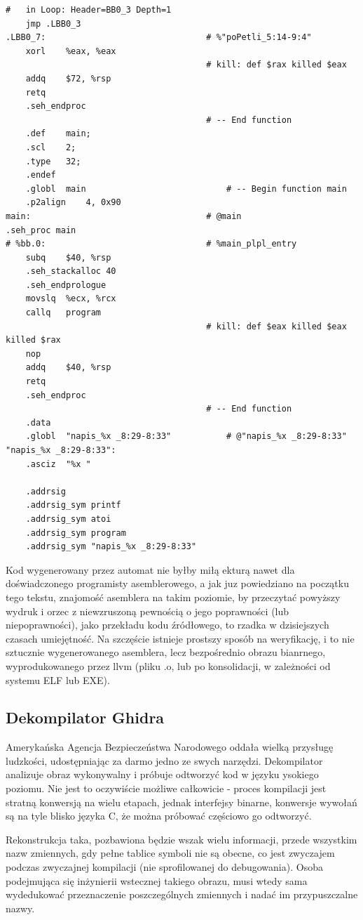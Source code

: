 \begin{lstlisting}[basicstyle=\scriptsize]
                                        #   in Loop: Header=BB0_3 Depth=1
	jmp	.LBB0_3
.LBB0_7:                                # %"poPetli_5:14-9:4"
	xorl	%eax, %eax
                                        # kill: def $rax killed $eax
	addq	$72, %rsp
	retq
	.seh_endproc
                                        # -- End function
	.def	main;
	.scl	2;
	.type	32;
	.endef
	.globl	main                            # -- Begin function main
	.p2align	4, 0x90
main:                                   # @main
.seh_proc main
# %bb.0:                                # %main_plpl_entry
	subq	$40, %rsp
	.seh_stackalloc 40
	.seh_endprologue
	movslq	%ecx, %rcx
	callq	program
                                        # kill: def $eax killed $eax killed $rax
	nop
	addq	$40, %rsp
	retq
	.seh_endproc
                                        # -- End function
	.data
	.globl	"napis_%x _8:29-8:33"           # @"napis_%x _8:29-8:33"
"napis_%x _8:29-8:33":
	.asciz	"%x "

	.addrsig
	.addrsig_sym printf
	.addrsig_sym atoi
	.addrsig_sym program
	.addrsig_sym "napis_%x _8:29-8:33"

\end{lstlisting}
Kod wygenerowany przez automat nie byłby miłą ekturą nawet dla doświadczonego programisty asemblerowego, a jak juz powiedziano na początku tego tekstu, znajomość asemblera na takim poziomie, by przeczytać powyższy wydruk i orzec z niewzruszoną pewnością o jego poprawności (lub niepoprawności), jako przekładu kodu źródłowego, to rzadka w dzisiejszych czasach umiejętność. Na szczęście istnieje prostszy sposób na weryfikację, i to nie sztucznie wygenerowanego asemblera, lecz bezpośrednio obrazu bianrnego, wyprodukowanego przez llvm (pliku .o, lub po konsolidacji, w zależności od systemu ELF lub EXE).

\subsection{Dekompilator Ghidra}
Amerykańska Agencja Bezpieczeństwa Narodowego oddała wielką przysługę ludzkości, udostępniając za darmo jedno ze swych narzędzi.\cite{ghidra} Dekompilator analizuje obraz wykonywalny i próbuje odtworzyć kod w języku ysokiego poziomu. Nie jest to oczywiście możliwe całkowicie - proces kompilacji jest stratną konwersją na wielu etapach, jednak interfejsy binarne, konwersje wywołań są na tyle blisko języka C, że można próbować częściowo go odtworzyć. 

Rekonstrukcja taka, pozbawiona będzie wszak wielu informacji, przede wszystkim nazw zmiennych, gdy pełne tablice symboli nie są obecne, co jest zwyczajem podczas zwyczajnej kompilacji (nie sprofilowanej do debugowania). Osoba podejmująca się inżynierii wstecznej takiego obrazu, musi wtedy sama wydedukować przeznaczenie poszczególnych zmiennych i nadać im przypuszczalne nazwy.

